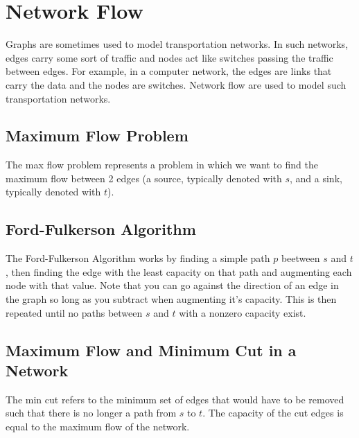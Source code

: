 \documentclass{article}
\begin{document}
\section{Network Flow}
Graphs are sometimes used to model transportation networks. In
such networks, edges carry some sort of traffic and nodes act like switches passing the
traffic between edges. For example, in a computer network, the edges are links that carry
the data and the nodes are switches. Network flow are used to model such transportation
networks.

\subsection{Maximum Flow Problem}
The max flow problem represents a problem in which we want to find the maximum flow between
2 edges (a source, typically denoted with $s$, and a sink, typically denoted with $t$). 

\subsection{Ford-Fulkerson Algorithm}
The Ford-Fulkerson Algorithm works by finding a simple path $p$ beetween $s$ and $t$, then finding
the edge with the least capacity on that path and augmenting each node with that value.
Note that you can go against the direction of an edge in the graph so long as you subtract when augmenting
it's capacity.
This is then repeated until no paths between $s$ and $t$ with a nonzero capacity exist. 

\subsection{Maximum Flow and Minimum Cut in a Network}
The min cut refers to the minimum set of edges that would have to be removed such that there is no longer
a path from $s$ to $t$. The capacity of the cut edges is equal to the maximum flow of the network.
\end{document}
